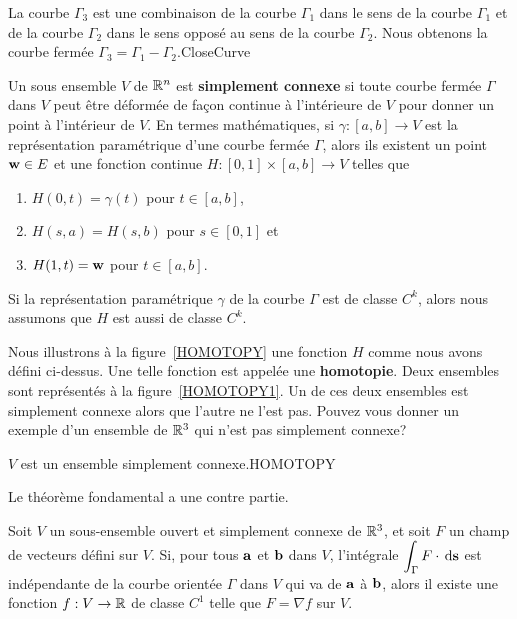 {
{La courbe $\Gamma_3$ est une combinaison de la courbe $\Gamma_1$
dans le sens de la courbe $\Gamma_1$ et de la courbe $\Gamma_2$
dans le sens opposé au sens de la courbe $\Gamma_2$.  Nous obtenons la
courbe fermée $\Gamma_3 = \Gamma_1 - \Gamma_2$.}{CloseCurve}

\begin{defn}[+\theory] 
Un sous ensemble $V$ de $\mathbb{R}^n$ est {\bfseries simplement connexe} si toute
courbe fermée $\Gamma$ dans $V$ peut être déformée de façon continue à
l'intérieure de $V$ pour donner un point à l'intérieur de $V$.  En termes
mathématiques, si $\gamma:[a,b]\rightarrow V$ est la représentation
paramétrique d'une courbe fermée $\Gamma$, alors ils existent un point
$\mathbf{w} \in E$ et une fonction continue $H:[0,1]\times [a,b]\rightarrow V$
telles que
\begin{enumerate}
\item $H(0,t) = \gamma(t)$ pour $t\in [a,b]$,
\item $H(s,a) = H(s,b)$ pour $s\in [0,1]$ et
\item $H(1,t) = \mathbf{w}$ pour $t\in [a,b]$.
\end{enumerate}
Si la représentation paramétrique $\gamma$ de la courbe $\Gamma$ est de
classe $C^k$, alors nous assumons que $H$ est aussi de classe $C^k$.
\end{defn}

Nous illustrons à la figure~\ref{HOMOTOPY} une fonction $H$
comme nous avons défini ci-dessus.  Une telle fonction est appelée une
{\bfseries homotopie}.  Deux ensembles sont
représentés à la figure~\ref{HOMOTOPY1}.  Un de ces deux ensembles est
simplement connexe alors que l'autre ne l'est pas.  Pouvez vous
donner un exemple d'un ensemble de $\mathbb{R}^3$ qui n'est pas simplement
connexe?

{$V$ est un ensemble simplement connexe.}{HOMOTOPY}


Le théorème fondamental a une contre partie.

\begin{theorem}
Soit $V$ un sous-ensemble ouvert et simplement connexe de $\mathbb{R}^3$, et
soit $F$ un champ de vecteurs défini sur $V$.  Si, pour tous $\mathbf{a}$
et $\mathbf{b}$ dans $V$, l'intégrale
$\displaystyle \int_\Gamma F \cdot \,\mathrm{d}\mathbf{s}$ est
indépendante de la courbe orientée $\Gamma$ dans $V$ qui va de
$\mathbf{a}$ à $\mathbf{b}$, alors il existe une fonction
$f:V\rightarrow \mathbb{R}$ de classe $C^1$ telle que
$F = \nabla f$ sur $V$.
\label{Fnablaf1}
\end{theorem}

}
